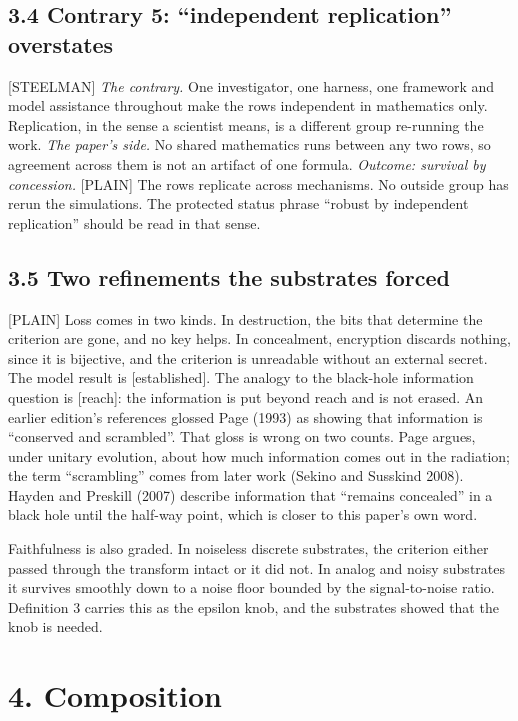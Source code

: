 \documentclass[11pt]{article}
\newcommand{\register}[1]{{\ttfamily\small #1}}
\begin{document}
\subsection*{3.4 Contrary 5: ``independent replication'' overstates}

\register{[STEELMAN]} \emph{The contrary.} One investigator, one harness, one framework and model assistance throughout make the rows independent in mathematics only. Replication, in the sense a scientist means, is a different group re-running the work. \emph{The paper's side.} No shared mathematics runs between any two rows, so agreement across them is not an artifact of one formula. \emph{Outcome: survival by concession.} \register{[PLAIN]} The rows replicate across mechanisms. No outside group has rerun the simulations. The protected status phrase ``robust by independent replication'' should be read in that sense.

\subsection*{3.5 Two refinements the substrates forced}

\register{[PLAIN]} Loss comes in two kinds. In destruction, the bits that determine the criterion are gone, and no key helps. In concealment, encryption discards nothing, since it is bijective, and the criterion is unreadable without an external secret. The model result is [established]. The analogy to the black-hole information question is [reach]: the information is put beyond reach and is not erased. An earlier edition's references glossed Page (1993) as showing that information is ``conserved and scrambled''. That gloss is wrong on two counts. Page argues, under unitary evolution, about how much information comes out in the radiation; the term ``scrambling'' comes from later work (Sekino and Susskind 2008). Hayden and Preskill (2007) describe information that ``remains concealed'' in a black hole until the half-way point, which is closer to this paper's own word.

Faithfulness is also graded. In noiseless discrete substrates, the criterion either passed through the transform intact or it did not. In analog and noisy substrates it survives smoothly down to a noise floor bounded by the signal-to-noise ratio. Definition 3 carries this as the epsilon knob, and the substrates showed that the knob is needed.

\section*{4. Composition}
\end{document}
